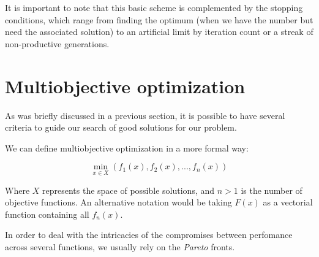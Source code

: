 	    It is important to note that this basic scheme is complemented by the stopping conditions, which range from finding the optimum (when we have the number but need the associated solution) to an artificial limit by iteration count or a streak of non-productive generations.

\section{Multiobjective optimization}

	As was briefly discussed in a previous section, it is possible to have several criteria to guide our search of good solutions for our problem.

	We can define multiobjective optimization in a more formal way:

	$$\min_{x \in X}(f_1(x),f_2(x),...,f_n(x))$$

	Where $X$ represents the space of possible solutions, and $n > 1$ is the number of objective functions. An alternative notation would be taking $F(x)$ as a vectorial function containing all $f_n(x)$.

	In order to deal with the intricacies of the compromises between perfomance across several functions, we usually rely on the \textit{Pareto} fronts.
